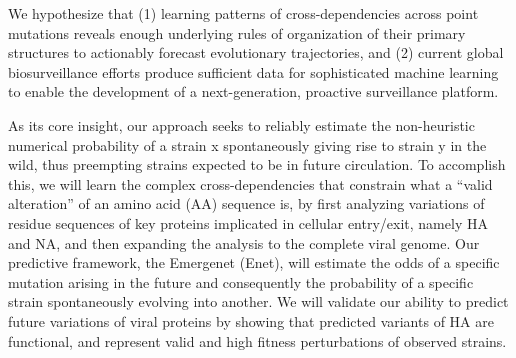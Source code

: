 \documentclass[onecolumn, compsoc,12pt]{IEEEtran}
\begin{document}
We hypothesize that (1) learning patterns of cross-dependencies across point mutations %
reveals enough underlying rules of organization of their primary structures to actionably forecast evolutionary trajectories, and (2) current global biosurveillance efforts produce sufficient data for sophisticated machine learning to enable the development of a next-generation, proactive surveillance platform.

As its core insight, our approach seeks to reliably estimate the non-heuristic numerical probability of a strain x spontaneously giving rise to strain y in the wild, thus preempting strains expected to be in future circulation. To accomplish this, we will learn the complex cross-dependencies that constrain what a ``valid alteration'' of an amino acid (AA) sequence is, by first analyzing variations of residue sequences of key proteins implicated in cellular entry/exit, namely HA and NA, and then expanding the analysis to the complete viral genome. Our predictive framework, the Emergenet (Enet), will estimate the odds of a specific mutation arising in the future and consequently the probability of a specific strain spontaneously evolving into another.
We will validate our ability to predict future variations of viral proteins by showing that \enet predicted variants of HA are functional, and represent valid and high fitness perturbations of observed strains.



\end{document}
